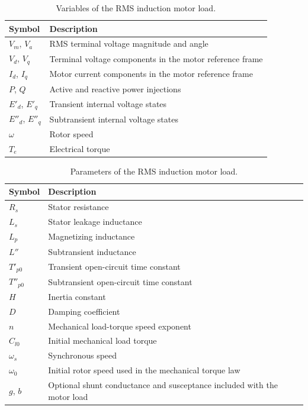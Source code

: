 \begin{table}[H]
    \centering
    \caption{Variables of the RMS induction motor load.}
    \begin{tabular}{ll}
        \toprule
        Symbol & Description \\
        \midrule
        $V_m$, $V_a$ & RMS terminal voltage magnitude and angle \\
        $V_d$, $V_q$ & Terminal voltage components in the motor reference frame \\
        $I_d$, $I_q$ & Motor current components in the motor reference frame \\
        $P$, $Q$ & Active and reactive power injections \\
        $E'_d$, $E'_q$ & Transient internal voltage states \\
        $E''_d$, $E''_q$ & Subtransient internal voltage states \\
        $\omega$ & Rotor speed \\
        $T_e$ & Electrical torque \\
        \bottomrule
    \end{tabular}
\end{table}

\begin{table}[H]
    \centering
    \caption{Parameters of the RMS induction motor load.}
    \begin{tabular}{ll}
        \toprule
        Symbol & Description \\
        \midrule
        $R_s$ & Stator resistance \\
        $L_s$ & Stator leakage inductance \\
        $L_p$ & Magnetizing inductance \\
        $L''$ & Subtransient inductance \\
        $T'_{p0}$ & Transient open-circuit time constant \\
        $T''_{p0}$ & Subtransient open-circuit time constant \\
        $H$ & Inertia constant \\
        $D$ & Damping coefficient \\
        $n$ & Mechanical load-torque speed exponent \\
        $C_{l0}$ & Initial mechanical load torque \\
        $\omega_s$ & Synchronous speed \\
        $\omega_0$ & Initial rotor speed used in the mechanical torque law \\
        $g$, $b$ & Optional shunt conductance and susceptance included with the motor load \\
        \bottomrule
    \end{tabular}
\end{table}

